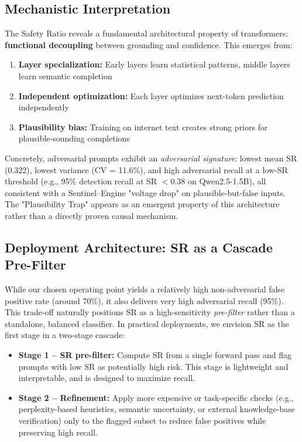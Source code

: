 \subsection{Mechanistic Interpretation}

The Safety Ratio reveals a fundamental architectural property of transformers: \textbf{functional decoupling} between grounding and confidence. This emerges from:

\begin{enumerate}
    \item \textbf{Layer specialization:} Early layers learn statistical patterns, middle layers learn semantic completion
    \item \textbf{Independent optimization:} Each layer optimizes next-token prediction independently
    \item \textbf{Plausibility bias:} Training on internet text creates strong priors for plausible-sounding completions
\end{enumerate}

Concretely, adversarial prompts exhibit an \textit{adversarial signature}: lowest mean SR (0.322), lowest variance (CV = 11.6\%), and high adversarial recall at a low-SR threshold (e.g., 95\% detection recall at SR $< 0.38$ on Qwen2.5-1.5B), all consistent with a Sentinel--Engine "voltage drop" on plausible-but-false inputs. The "Plausibility Trap" appears as an emergent property of this architecture rather than a directly proven causal mechanism.

\subsection{Deployment Architecture: SR as a Cascade Pre-Filter}

While our chosen operating point yields a relatively high non-adversarial false positive rate (around 70\%), it also delivers very high adversarial recall (95\%). This trade-off naturally positions SR as a high-sensitivity \emph{pre-filter} rather than a standalone, balanced classifier. In practical deployments, we envision SR as the first stage in a two-stage cascade:

\begin{itemize}
    \item \textbf{Stage 1 -- SR pre-filter:} Compute SR from a single forward pass and flag prompts with low SR as potentially high risk. This stage is lightweight and interpretable, and is designed to maximize recall.
    \item \textbf{Stage 2 -- Refinement:} Apply more expensive or task-specific checks (e.g., perplexity-based heuristics, semantic uncertainty, or external knowledge-base verification) only to the flagged subset to reduce false positives while preserving high recall.
\end{itemize}

